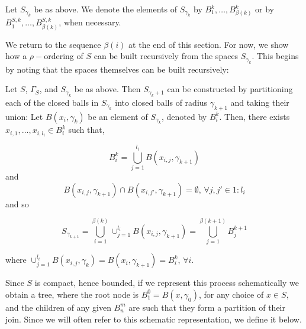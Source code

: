 \begin{notation}
Let $S_{\gamma_k}$ be as above. We denote the elements of $S_{\gamma_k}$ by $B^k_1, \ldots, B^k_{\beta(k)}$ or by $B^{S,k}_1, \ldots, B^{S,k}_{\beta(k)}$, when necessary.
\end{notation}


We return to the sequence $\beta(i)$ at the end of this section. For now, we show how a $\rho-$ordering of $S$ can be built recursively from the spaces $S_{\gamma_k}$. This begins by noting that the spaces themselves can be built recursively:\\

\begin{observation}
Let $S$, $\Gamma_S$, and $S_{\gamma_k}$ be as above. Then $S_{\gamma_k+1}$ can be constructed by partitioning each of the closed balls in $S_{\gamma_k}$ into closed balls of radius $\gamma_{k+1}$ and taking their union:  Let $B(x_i, \gamma_k)$  be an element of $S_{\gamma_k}$, denoted by  $B^k_i$. Then, there exists $x_{i,1},\ldots, x_{i,l_{i}} \in B^k_i$ such that,

\[B^k_i=  \bigcup_{j=1}^{l_i} B(x_{i,j}, \gamma_{k+1})\] and  \[B(x_{i,j}, \gamma_{k+1}) \cap B(x_{i,j'}, \gamma_{k+1}) = \emptyset \text{, }\forall j,j' \in 1:l_i\]
and so

\[S_{\gamma_{k+1}} =  \bigcup_{i=1}^{\beta(k)}   \cup_{j=1}^{l_i} B(x_{i,j}, \gamma_{k+1}) = \bigcup^{\beta(k+1)}_{j=1}B^{k+1}_{j}\] 


where $\cup_{j=1}^{l_i} B(x_{i,j},\gamma_{k})=B(x_i, \gamma_{k+1}) = B^k_i$, $\forall i$.
\end{observation}

Since $S$ is compact, hence bounded, if we represent this process schematically we obtain a tree, where the root node is $B^0_1=B(x,\gamma_0)$, for any choice of $x \in S$, and the children of any given $B^m_n$ are such that they form a partition of their join.  Since we will often refer to this schematic representation, we define it below.\\

